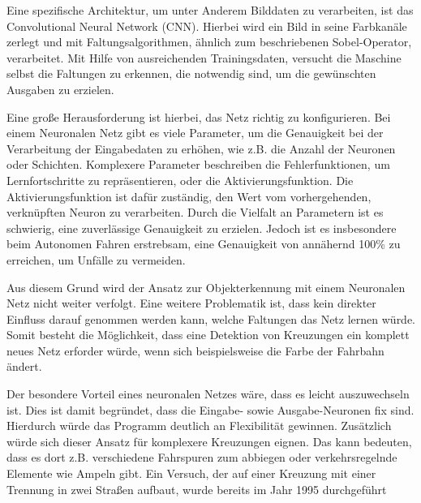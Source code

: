 Eine spezifische Architektur, um unter Anderem Bilddaten zu verarbeiten, ist das Convolutional Neural Network (CNN). Hierbei wird ein Bild in seine Farbkanäle zerlegt und mit Faltungsalgorithmen,
ähnlich zum beschriebenen Sobel-Operator, verarbeitet. Mit Hilfe von ausreichenden Trainingsdaten, versucht die Maschine selbst die Faltungen zu erkennen, die notwendig sind, um die gewünschten
Ausgaben zu erzielen.

Eine große Herausforderung ist hierbei, das Netz richtig zu konfigurieren. Bei einem Neuronalen Netz gibt es viele Parameter, um die Genauigkeit bei der Verarbeitung der Eingabedaten zu erhöhen, wie z.B.
die Anzahl der Neuronen oder Schichten. Komplexere Parameter beschreiben die Fehlerfunktionen, um Lernfortschritte zu repräsentieren, oder die Aktivierungsfunktion. Die Aktivierungsfunktion
ist dafür zuständig, den Wert vom vorhergehenden, verknüpften Neuron zu verarbeiten.
Durch die Vielfalt an Parametern ist es schwierig, eine zuverlässige Genauigkeit zu erzielen. Jedoch ist es insbesondere beim Autonomen Fahren erstrebsam, eine Genauigkeit von annähernd 100\% zu erreichen,
um Unfälle zu vermeiden.

Aus diesem Grund wird der Ansatz zur Objekterkennung mit einem Neuronalen Netz nicht weiter verfolgt. Eine weitere Problematik ist, dass kein direkter Einfluss darauf genommen werden kann, welche
Faltungen das Netz lernen würde. Somit besteht die Möglichkeit, dass eine Detektion von Kreuzungen ein komplett neues Netz erforder würde, wenn sich beispielsweise die Farbe der Fahrbahn ändert.

Der besondere Vorteil eines neuronalen Netzes wäre, dass es leicht auszuwechseln ist. Dies ist damit begründet, dass die Eingabe- sowie Ausgabe-Neuronen fix sind. Hierdurch würde
das Programm deutlich an Flexibilität gewinnen. Zusätzlich würde sich dieser Ansatz für komplexere Kreuzungen eignen. Das kann bedeuten, dass es dort z.B. verschiedene Fahrspuren
zum abbiegen oder verkehrsregelnde Elemente wie Ampeln gibt. Ein Versuch, der auf einer Kreuzung mit einer Trennung in zwei Straßen aufbaut, wurde bereits im Jahr 1995 durchgeführt \cite{ai-intersection-detection}


